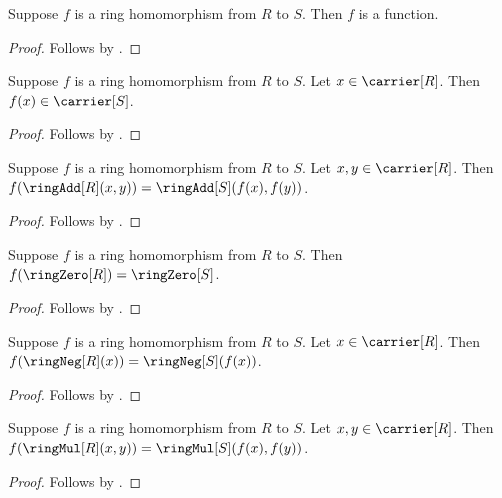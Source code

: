 \begin{corollary}\label{ring_hom_is_function}
    Suppose $f$ is a ring homomorphism from $R$ to $S$.
    Then $f$ is a function.
\end{corollary}
\begin{proof}
    Follows by .
\end{proof}

\begin{corollary}\label{ring_hom_apply_type}
    Suppose $f$ is a ring homomorphism from $R$ to $S$.
    Let $x\in\carrier[R]$.
    Then $f(x)\in\carrier[S]$.
\end{corollary}
\begin{proof}
    Follows by .
\end{proof}

\begin{proposition}\label{ring_hom_add}
    Suppose $f$ is a ring homomorphism from $R$ to $S$.
    Let $x,y\in\carrier[R]$.
    Then $f(\ringAdd[R](x,y))=\ringAdd[S](f(x),f(y))$.
\end{proposition}
\begin{proof}
    Follows by
        .
\end{proof}

\begin{proposition}\label{ring_hom_zero}
    Suppose $f$ is a ring homomorphism from $R$ to $S$.
    Then $f(\ringZero[R])=\ringZero[S]$.
\end{proposition}
\begin{proof}
    Follows by
        .
\end{proof}

\begin{proposition}\label{ring_hom_neg}
    Suppose $f$ is a ring homomorphism from $R$ to $S$.
    Let $x\in\carrier[R]$.
    Then $f(\ringNeg[R](x))=\ringNeg[S](f(x))$.
\end{proposition}
\begin{proof}
    Follows by
        .
\end{proof}

\begin{proposition}\label{ring_hom_mul}
    Suppose $f$ is a ring homomorphism from $R$ to $S$.
    Let $x,y\in\carrier[R]$.
    Then $f(\ringMul[R](x,y))=\ringMul[S](f(x),f(y))$.
\end{proposition}
\begin{proof}
    Follows by
        .
\end{proof}

